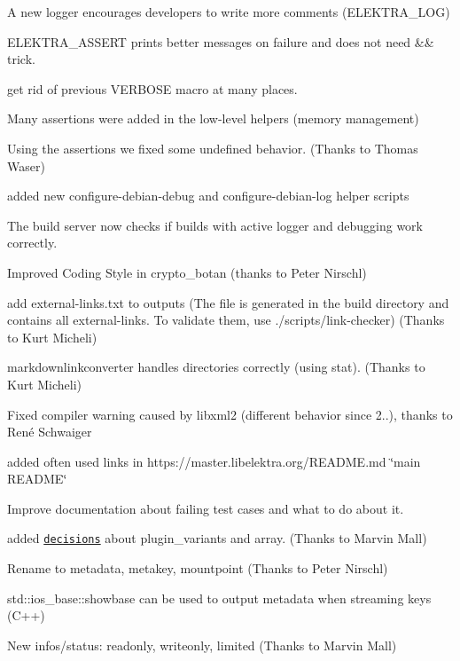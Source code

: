 \begin{DoxyItemize}
\item A new logger encourages developers to write more comments ({\ttfamily E\+L\+E\+K\+T\+R\+A\+\_\+\+L\+OG})
\item {\ttfamily E\+L\+E\+K\+T\+R\+A\+\_\+\+A\+S\+S\+E\+RT} prints better messages on failure and does not need {\ttfamily \&\&} trick.
\item get rid of previous {\ttfamily V\+E\+R\+B\+O\+SE} macro at many places.
\item Many assertions were added in the low-\/level helpers (memory management)
\item Using the assertions we fixed some undefined behavior. (Thanks to Thomas Waser)
\item added new {\ttfamily configure-\/debian-\/debug} and {\ttfamily configure-\/debian-\/log} helper scripts
\item The build server now checks if builds with active logger and debugging work correctly.
\item Improved Coding Style in crypto\+\_\+botan (thanks to Peter Nirschl)
\item add {\ttfamily external-\/links.\+txt} to {\ttfamily outputs} (The file is generated in the build directory and contains all external-\/links. To validate them, use {\ttfamily ./scripts/link-\/checker}) (Thanks to Kurt Micheli)
\item {\ttfamily markdownlinkconverter} handles directories correctly (using {\ttfamily stat}). (Thanks to Kurt Micheli)
\item Fixed compiler warning caused by libxml2 (different behavior since 2..), thanks to René Schwaiger
\item added often used links in https\+://master.libelektra.\+org/\+R\+E\+A\+D\+ME.md \char`\"{}main R\+E\+A\+D\+M\+E\char`\"{}
\item Improve documentation about failing test cases and what to do about it.
\item added \href{https://master.libelektra.org/doc/decisions/}{\tt decisions} about {\ttfamily plugin\+\_\+variants} and {\ttfamily array}. (Thanks to Marvin Mall)
\item Rename to metadata, metakey, mountpoint (Thanks to Peter Nirschl)
\item std\+::ios\+\_\+base\+::showbase can be used to output metadata when streaming keys (C++)
\item New {\ttfamily infos/status}\+: {\ttfamily readonly}, {\ttfamily writeonly}, {\ttfamily limited} (Thanks to Marvin Mall)

\end{DoxyItemize}
